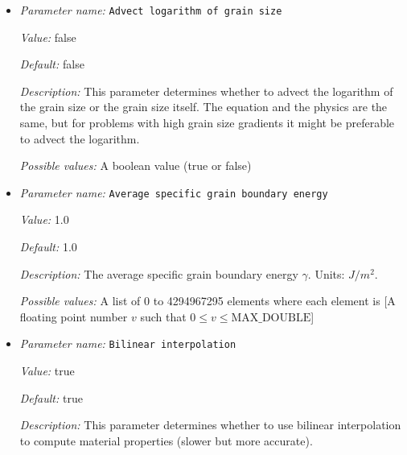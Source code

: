 \begin{itemize}
\item {\it Parameter name:} {\tt Advect logarithm of grain size}
\label{parameters:Material model/Grain size model/Advect logarithm of grain size}
\label{parameters:Material_20model/Grain_20size_20model/Advect_20logarithm_20of_20grain_20size}


{\it Value:} false


{\it Default:} false


{\it Description:} This parameter determines whether to advect the logarithm of the grain size or the grain size itself. The equation and the physics are the same, but for problems with high grain size gradients it might be preferable to advect the logarithm. 


{\it Possible values:} A boolean value (true or false)
\item {\it Parameter name:} {\tt Average specific grain boundary energy}
\label{parameters:Material model/Grain size model/Average specific grain boundary energy}
\label{parameters:Material_20model/Grain_20size_20model/Average_20specific_20grain_20boundary_20energy}


{\it Value:} 1.0


{\it Default:} 1.0


{\it Description:} The average specific grain boundary energy $\gamma$. Units: $J/m^2$.


{\it Possible values:} A list of 0 to 4294967295 elements where each element is [A floating point number $v$ such that $0 \leq v \leq \text{MAX\_DOUBLE}$]
\item {\it Parameter name:} {\tt Bilinear interpolation}
\label{parameters:Material model/Grain size model/Bilinear interpolation}
\label{parameters:Material_20model/Grain_20size_20model/Bilinear_20interpolation}


{\it Value:} true


{\it Default:} true


{\it Description:} This parameter determines whether to use bilinear interpolation to compute material properties (slower but more accurate).



\end{itemize}
